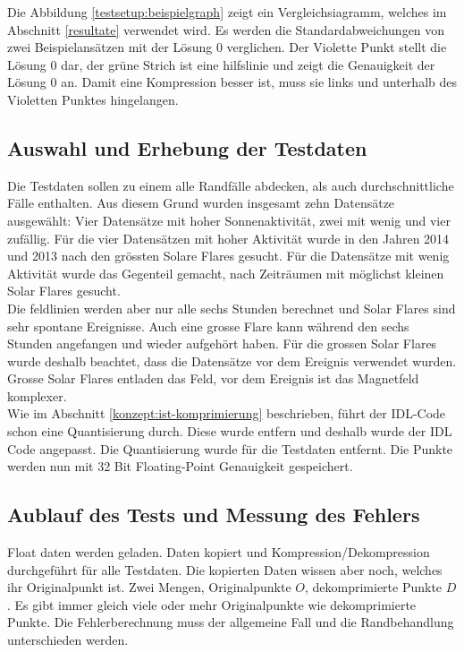 Die Abbildung \ref{testsetup:beispielgraph} zeigt ein Vergleichsiagramm, welches im Abschnitt \ref{resultate} verwendet wird. Es werden die Standardabweichungen von zwei Beispielansätzen mit der Lösung 0 verglichen. Der Violette Punkt stellt die Lösung 0 dar, der grüne Strich ist eine hilfslinie und zeigt die Genauigkeit der Lösung 0 an. Damit eine Kompression besser ist, muss sie links und unterhalb des Violetten Punktes hingelangen.

\subsection{Auswahl und Erhebung der Testdaten}
Die Testdaten sollen zu einem alle Randfälle abdecken, als auch durchschnittliche Fälle enthalten. Aus diesem Grund wurden insgesamt zehn Datensätze ausgewählt: Vier Datensätze mit hoher Sonnenaktivität, zwei mit wenig und vier zufällig. Für die vier Datensätzen mit hoher Aktivität wurde in den Jahren 2014 und 2013 nach den grössten Solare Flares gesucht. Für die Datensätze mit wenig Aktivität wurde das Gegenteil gemacht, nach Zeiträumen mit möglichst kleinen Solar Flares gesucht.\\
Die feldlinien werden aber nur alle sechs Stunden berechnet und Solar Flares sind sehr spontane Ereignisse. Auch eine grosse Flare kann während den sechs Stunden angefangen und wieder aufgehört haben. Für die grossen Solar Flares wurde deshalb beachtet, dass die Datensätze vor dem Ereignis verwendet wurden. Grosse Solar Flares entladen das Feld, vor dem Ereignis ist das Magnetfeld komplexer.\\
[\baselineskip]
Wie im Abschnitt \ref{konzept:ist-komprimierung} beschrieben, führt der IDL-Code schon eine Quantisierung durch. Diese wurde entfern und  deshalb wurde der IDL Code angepasst. Die Quantisierung wurde für die Testdaten entfernt. Die Punkte werden nun mit 32 Bit Floating-Point Genauigkeit gespeichert.

\subsection{Aublauf des Tests und Messung des Fehlers}
Float daten werden geladen. Daten kopiert und Kompression/Dekompression durchgeführt für alle Testdaten. Die kopierten Daten wissen aber noch, welches ihr Originalpunkt ist.
Zwei Mengen, Originalpunkte $O$, dekomprimierte Punkte $D$. Es gibt immer gleich viele oder mehr Originalpunkte wie dekomprimierte Punkte. Die Fehlerberechnung muss der allgemeine Fall und die Randbehandlung unterschieden werden.

